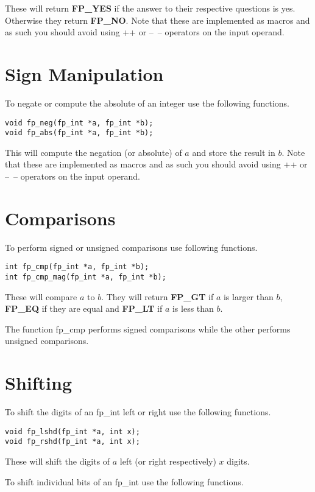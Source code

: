 \documentclass[b5paper]{book}
\begin{document}
These will return \textbf{FP\_YES} if the answer to their respective questions is yes.  Otherwise they
return \textbf{FP\_NO}.  Note that these are implemented as macros and as such you should avoid using 
++ or --~-- operators on the input operand.

\section{Sign Manipulation}
To negate or compute the absolute of an integer use the following functions.

 
\begin{verbatim}
void fp_neg(fp_int *a, fp_int *b);
void fp_abs(fp_int *a, fp_int *b);
\end{verbatim}
This will compute the negation (or absolute) of $a$ and store the result in $b$.  Note that these 
are implemented as macros and as such you should avoid using ++ or --~-- operators on the input 
operand.

\section{Comparisons}
To perform signed or unsigned comparisons use following functions.

 
\begin{verbatim}
int fp_cmp(fp_int *a, fp_int *b);
int fp_cmp_mag(fp_int *a, fp_int *b);
\end{verbatim}
These will compare $a$ to $b$.  They will return \textbf{FP\_GT} if $a$ is larger than $b$, 
\textbf{FP\_EQ} if they are equal and \textbf{FP\_LT} if $a$ is less than $b$.

The function fp\_cmp performs signed comparisons while the other performs unsigned comparisons.

\section{Shifting}
To shift the digits of an fp\_int left or right use the following functions.

 
\begin{verbatim}
void fp_lshd(fp_int *a, int x);
void fp_rshd(fp_int *a, int x);
\end{verbatim}

These will shift the digits of $a$ left (or right respectively) $x$ digits.  

To shift individual bits of an fp\_int use the following functions.
\end{document}
